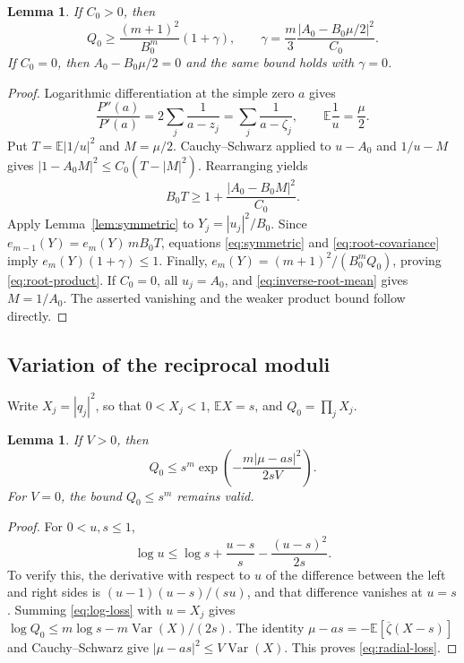 \documentclass[11pt,reqno]{amsart}
\newtheorem{lem}[thm]{Lemma}
\theoremstyle{definition}
\theoremstyle{remark}
\numberwithin{equation}{section}
\newcommand{\E}{\mathbb E}
\newcommand{\Var}{\operatorname{Var}}
\begin{document}
\begin{lem}\label{lem:root-product}
If $C_0>0$, then
\begin{equation}\label{eq:root-product}
 Q_0\ge\frac{(m+1)^2}{B_0^m}(1+\gamma),
 \qquad
 \gamma=\frac m3\frac{|A_0-B_0\mu/2|^2}{C_0}.
\end{equation}
If $C_0=0$, then $A_0-B_0\mu/2=0$ and the same bound holds with $\gamma=0$.
\end{lem}
\begin{proof}
Logarithmic differentiation at the simple zero $a$ gives
\begin{equation}\label{eq:inverse-root-mean}
 \frac{P''(a)}{P'(a)}=2\sum_j\frac1{a-z_j}
 =\sum_j\frac1{a-\zeta_j},\qquad \E\frac1u=\frac\mu2.
\end{equation}
Put $T=\E|1/u|^2$ and $M=\mu/2$. Cauchy--Schwarz applied to $u-A_0$ and $1/u-M$ gives
$|1-A_0M|^2\le C_0(T-|M|^2)$.
Rearranging yields
\begin{equation}\label{eq:root-covariance}
 B_0T\ge1+\frac{|A_0-B_0M|^2}{C_0}.
\end{equation}
Apply Lemma~\ref{lem:symmetric} to $Y_j=|u_j|^2/B_0$. Since
$e_{m-1}(Y)=e_m(Y)\,mB_0T$, equations \eqref{eq:symmetric} and \eqref{eq:root-covariance} imply $e_m(Y)(1+\gamma)\le1$. Finally,
$e_m(Y)=(m+1)^2/(B_0^mQ_0)$, proving \eqref{eq:root-product}.
If $C_0=0$, all $u_j=A_0$, and \eqref{eq:inverse-root-mean} gives $M=1/A_0$. The asserted vanishing and the weaker product bound follow directly.
\end{proof}

\subsection{Variation of the reciprocal moduli}

Write $X_j=|q_j|^2$, so that $0<X_j<1$, $\E X=s$, and $Q_0=\prod_jX_j$.

\begin{lem}\label{lem:radial-loss}
If $V>0$, then
\begin{equation}\label{eq:radial-loss}
 Q_0\le s^m\exp\left(-\frac{m|\mu-as|^2}{2sV}\right).
\end{equation}
For $V=0$, the bound $Q_0\le s^m$ remains valid.
\end{lem}
\begin{proof}
For $0<u,s\le1$,
\begin{equation}\label{eq:log-loss}
 \log u\le\log s+\frac{u-s}{s}-\frac{(u-s)^2}{2s}.
\end{equation}
To verify this, the derivative with respect to $u$ of the difference between the left and right sides is $(u-1)(u-s)/(su)$, and that difference vanishes at $u=s$. Summing \eqref{eq:log-loss} with $u=X_j$ gives
$\log Q_0\le m\log s-m\Var(X)/(2s)$.
The identity $\mu-as=-\E[\overline\zeta(X-s)]$ and Cauchy--Schwarz give $|\mu-as|^2\le V\Var(X)$. This proves \eqref{eq:radial-loss}.
\end{proof}
\end{document}
